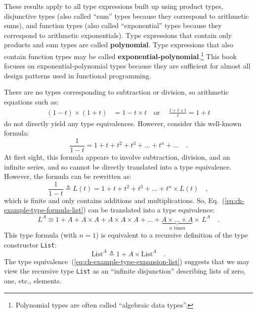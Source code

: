 These results apply to all type expressions built up using product
types, disjunctive types (also called \textsf{``}sum\textsf{''} types because they
correspond to arithmetic sums), and function types (also called \textsf{``}exponential\textsf{''}
types because they correspond to arithmetic exponentials). Type expressions
that contain only products and sum types are called \textbf{polynomial}.
Type expressions that also contain function types may be called \textbf{exponential-polynomial}.\footnote{Polynomial types are often called \textsf{``}algebraic data types\textsf{''}.}
This book focuses on exponential-polynomial types because they are
sufficient for almost all design patterns used in functional programming.

There are no types corresponding to subtraction or division, so arithmetic
equations such as:
\begin{align*}
\left(1-t\right)\times\left(1+t\right) & =1-t\times t\quad\text{or }\quad\frac{t+t\times t}{t}=1+t
\end{align*}
do not directly yield any type equivalences. However, consider this
well-known formula:
\[
\frac{1}{1-t}=1+t+t^{2}+t^{3}+...+t^{n}+...\quad.
\]
At first sight, this formula appears to involve subtraction, division,
and an infinite series, and so cannot be directly translated into
a type equivalence. However, the formula can be rewritten as:
\begin{equation}
\frac{1}{1-t}\triangleq L(t)=1+t+t^{2}+t^{3}+...+t^{n}\times L(t)\quad,\label{eq:ch-example-type-formula-list}
\end{equation}
which is finite and only contains additions and multiplications. So,
Eq.~(\ref{eq:ch-example-type-formula-list}) can be translated into
a type equivalence:
\begin{equation}
L^{A}\cong1+A+A\times A+A\times A\times A+...+\underbrace{A\times...\times A}_{n\text{ times}}\times\,L^{A}\quad.\label{eq:ch-example-type-expansion-list}
\end{equation}
This type formula (with $n=1$) is equivalent to a recursive definition
of the type constructor \lstinline!List!:
\[
\text{List}^{A}\triangleq1+A\times\text{List}^{A}\quad.
\]
The type equivalence~(\ref{eq:ch-example-type-expansion-list}) suggests
that we may view the recursive type \lstinline!List! as an \textsf{``}infinite
disjunction\textsf{''} describing lists of zero, one, etc., elements.

